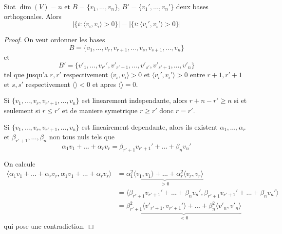 \begin{theorem}
Siot $\dim(V)=n$ et $B=\{ v_{1},\dots,v_{n} \}$, $B'=\{ v_{1}',\dots,v_{n}' \}$ deux bases orthogonales. Alors 
$$
|\{ i:\langle v_{i},v_{i} \rangle>0  \}|=|\{ i:\langle v_{i}',v_{i}' \rangle >0 \}|
$$
\end{theorem}
\begin{proof}
On veut ordonner les bases 
$$
B=\{ v_{1},\dots,v_{r},v_{r +1},\dots,v_{s},v_{s +1},\dots,v_{n} \}
$$
et 
$$
B'=\{ v'_{1},\dots,v_{r'}',v'_{r'+1},\dots,v'_{s'},v'_{s'+1},\dots,v'_{n} \}
$$
tel que jusqu'a $r,r'$ respectivement $\langle v_{i},v_{i} \rangle>0$ et $\langle v_{i}',v_{i}' \rangle>0$ entre $r+1,r'+1$ et $s,s'$ respectivement $\langle  \rangle<0$ et apres $\langle  \rangle=0$.

Si $\{ v_{1},\dots,v_{r},v_{r'+1},\dots,v_{n} \}$ est linearement independante, alors $r+n-r'\geq n$ si et seulement si $r\leq r'$ et de maniere symetrique $r\geq r'$ donc $r=r'$.

Si $\{ v_{1},\dots,v_{r},v_{r'+1},\dots,v_{n} \}$ est lineairement dependante, alors ils existent $\alpha_{1},\dots,\alpha _{r}$ et $\beta _{r'+1},\dots,\beta _{n}$ non tous nuls tels que 
$$
\alpha_{1}v_{1}+\dots +\alpha _{r}v_{r}=\beta _{r'+1}v_{r'+1}'+\dots +\beta _{n}v_{n}'
$$

On calcule
\begin{align*}
\langle \alpha_{1}v_{1}+\dots +\alpha _{r}v_{r},\alpha_{1}v_{1}+\dots +\alpha _{r}v_{r} \rangle  & =\underbrace{ \alpha_{1}^{2}\langle v_{1},v_{1} \rangle +\dots +\alpha _{r}^{2}\langle v_{r},v_{r} \rangle }_{ >0 }  \\
	 & =\langle \beta _{r'+1}v_{r'+1}'+\dots +\beta _{n}v_{n}',\beta _{r'+1}v_{r'+1}'+\dots +\beta _{n}v_{n}' \rangle  \\
	 & =\underbrace{ \beta _{r'+1}^{2}\langle v'_{r'+1},v_{r'+1}' \rangle +\dots +\beta _{n}^{2}\langle v'_{n},v'_{n} \rangle  }_{ <0 }
\end{align*}
qui pose une contradiction.
\end{proof}